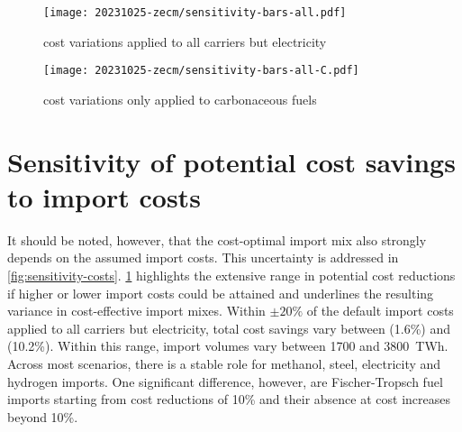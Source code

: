 \begin{figure*}
    \begin{subfigure}[t]{\columnwidth}
        \caption{cost variations applied to all carriers but electricity}
        \label{fig:sensitivity-costs:A}
        \texttt{[image: 20231025-zecm/sensitivity-bars-all.pdf]}
    \end{subfigure}
    \begin{subfigure}[t]{\columnwidth}
        \caption{cost variations only applied to carbonaceous fuels}
        \label{fig:sensitivity-costs:B}
        \texttt{[image: 20231025-zecm/sensitivity-bars-all-C.pdf]}
    \end{subfigure}
    \caption{\textbf{Effect of import cost variations on cost savings and import shares with all vectors allowed.}
    In panel (a), indicated relative cost changes are applied uniformly to all
    vectors but electricity imports. In panel (b), cost changes are only applied
    to carbonaceous fuels (methane, methanol and Fischer-Tropsch). Top subpanels
    show potential cost savings compared to the scenario without imports. Bottom
    subpanels show the share and composition of different import vectors in
    relation to total energy system costs. The information is shown both in
    absolute terms and relative terms compared to the scenario without imports.
    }
    \label{fig:sensitivity-costs}
\end{figure*}

\section*{Sensitivity of potential cost savings to import costs}

It should be noted, however, that the cost-optimal import mix also strongly
depends on the assumed import costs. This uncertainty is addressed in
\cref{fig:sensitivity-costs}. \cref{fig:sensitivity-costs:A} highlights the
extensive range in potential cost reductions if higher or lower import costs
could be attained and underlines the resulting variance in cost-effective import
mixes. Within $\pm 20\%$ of the default import costs applied to all carriers but
electricity, total cost savings vary between  (1.6\%) and 
(10.2\%). Within this range, import volumes vary between 1700 and 3800~TWh.
Across most scenarios, there is a stable role for methanol, steel, electricity
and hydrogen imports. One significant difference, however, are Fischer-Tropsch
fuel imports starting from cost reductions of 10\% and their absence at cost
increases beyond 10\%.

